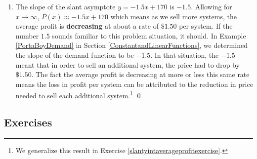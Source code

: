 \documentclass{ximera}
\begin{document}
\begin{ex}
\begin{enumerate}
\begin{center}
\end{center}

\item The slope of the slant asymptote $y = -1.5x+170$ is $-1.5$.  Allowing for $x \rightarrow \infty$, $\overline{P}(x) \approx -1.5 x + 170$ which means as we sell more systems, the average profit is \textbf{decreasing} at about a rate of $\$ 1.50$ per system.  If the number $1.5$ sounds familiar to this problem situation, it should.  In Example \ref{PortaBoyDemand} in Section \ref{ConstantandLinearFunctions}, we determined the slope of the demand function to be $-1.5$. In that situation, the $-1.5$ meant that in order to sell an additional system, the price had to drop by $\$ 1.50$.  The fact the average profit is decreasing at more or less this same rate means the loss in profit per system can be attributed to the reduction in price needed to sell each additional system.\footnote{We generalize this result in Exercise \ref{slantyintaverageprofitexercise}.} \qed

\end{enumerate}


\end{ex}

\newpage

\subsection{Exercises}


\closegraphsfile
\end{document}
